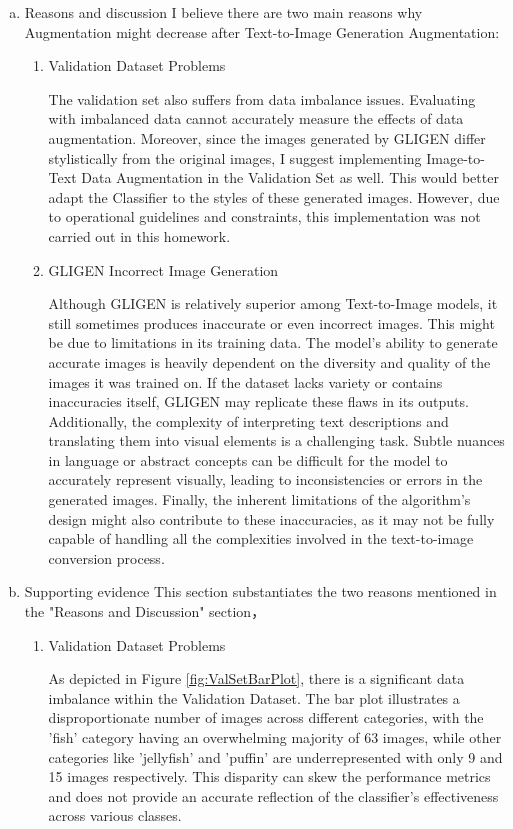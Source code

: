 \documentclass[10pt,a4paper]{article}
\begin{document}
\begin{enumerate}[(a)]
\begin{itemize}
\end{itemize}
\item Reasons and discussion
I believe there are two main reasons why Augmentation might decrease after Text-to-Image Generation Augmentation:
\begin{enumerate}[(1)]
\item Validation Dataset Problems

The validation set also suffers from data imbalance issues. Evaluating with imbalanced data cannot accurately measure the effects of data augmentation. Moreover, since the images generated by GLIGEN differ stylistically from the original images, I suggest implementing Image-to-Text Data Augmentation in the Validation Set as well. This would better adapt the Classifier to the styles of these generated images. However, due to operational guidelines and constraints, this implementation was not carried out in this homework.

\item GLIGEN Incorrect Image Generation

Although GLIGEN is relatively superior among Text-to-Image models, it still sometimes produces inaccurate or even incorrect images. This might be due to limitations in its training data. The model's ability to generate accurate images is heavily dependent on the diversity and quality of the images it was trained on. If the dataset lacks variety or contains inaccuracies itself, GLIGEN may replicate these flaws in its outputs. Additionally, the complexity of interpreting text descriptions and translating them into visual elements is a challenging task. Subtle nuances in language or abstract concepts can be difficult for the model to accurately represent visually, leading to inconsistencies or errors in the generated images. Finally, the inherent limitations of the algorithm's design might also contribute to these inaccuracies, as it may not be fully capable of handling all the complexities involved in the text-to-image conversion process.
\end{enumerate}


\item Supporting evidence
This section substantiates the two reasons mentioned in the "Reasons and Discussion" section，
\begin{enumerate}[(1)]
\item Validation Dataset Problems

As depicted in Figure \ref{fig:ValSetBarPlot}, there is a significant data imbalance within the Validation Dataset. The bar plot illustrates a disproportionate number of images across different categories, with the 'fish' category having an overwhelming majority of 63 images, while other categories like 'jellyfish' and 'puffin' are underrepresented with only 9 and 15 images respectively. This disparity can skew the performance metrics and does not provide an accurate reflection of the classifier's effectiveness across various classes.


\end{enumerate}
\end{enumerate}
\end{document}
